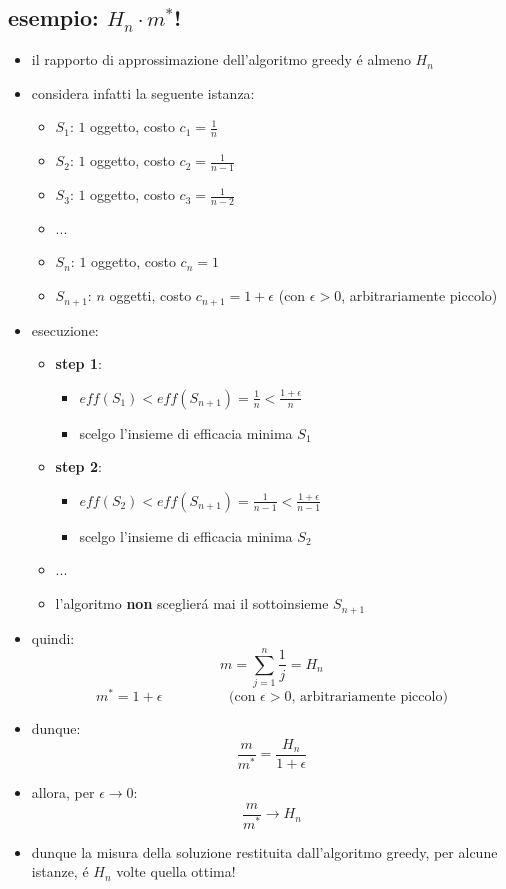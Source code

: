 \subsection*{esempio: $H_n\cdot m^*$!}
\begin{flushleft}
	\begin{itemize}
		\item il rapporto di approssimazione dell'algoritmo greedy \'e almeno $H_n$
		\item considera infatti la seguente istanza:
		\begin{itemize}
			\item $S_1$: $1$ oggetto, costo $c_1=\frac{1}{n}$
			\item $S_2$: $1$ oggetto, costo $c_2=\frac{1}{n-1}$
			\item $S_3$: $1$ oggetto, costo $c_3=\frac{1}{n-2}$
			\item ...
			\item $S_n$: $1$ oggetto, costo $c_n=1$
			\item $S_{n+1}$: $n$ oggetti, costo $c_{n+1}=1+\epsilon$ (con $\epsilon>0$, arbitrariamente piccolo)
		\end{itemize}
		\item esecuzione:
		\begin{itemize}
			\item \textbf{step 1}:
			\begin{itemize}
				\item $eff(S_1)<eff(S_{n+1})=\frac{1}{n}<\frac{1+\epsilon}{n}$
				\item scelgo l'insieme di efficacia minima $S_1$
			\end{itemize}
			\item \textbf{step 2}:
			\begin{itemize}
				\item $eff(S_2)<eff(S_{n+1})=\frac{1}{n-1}<\frac{1+\epsilon}{n-1}$
				\item scelgo l'insieme di efficacia minima $S_2$
			\end{itemize}
			\item ...
			\item l'algoritmo \textbf{non} sceglier\'a mai il sottoinsieme $S_{n+1}$
		\end{itemize}
		\item quindi:
			$$m=\sum_{j=1}^n\frac{1}{j}=H_n$$
			$$m^*=1+\epsilon\hspace{2cm}\text{(con $\epsilon>0$, arbitrariamente piccolo)}$$
		\item dunque:
			$$\frac{m}{m^*}=\frac{H_n}{1+\epsilon}$$
		\item allora, per $\epsilon\rightarrow 0$:
			$$\frac{m}{m^*}\rightarrow H_n$$
		\item dunque la misura della soluzione restituita dall'algoritmo greedy, per alcune istanze,
			\'e $H_n$ volte quella ottima!
	\end{itemize}
\end{flushleft}


\newpage
